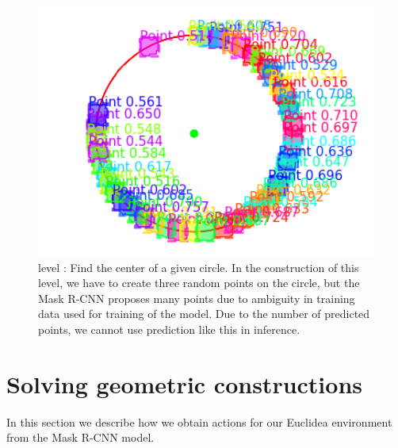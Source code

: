 \newline \newline
\begin{figure}[h]
\centering
\includegraphics[width=120mm]{img/GenerationExamples/NotFixedAmbiguityCircleCenter.png}
\caption{level : Find the center of a given circle. In the construction of this level, we have to create three random points on the circle, but the Mask R-CNN proposes many points due to ambiguity in training data used for training of the model. Due to the number of predicted points, we cannot use prediction like this in inference.}
\label{mrcnn_example_01_12}
\end{figure}
\section{Solving geometric constructions}
In this section we describe how we obtain actions for our Euclidea environment from the Mask {R-CNN} model.
